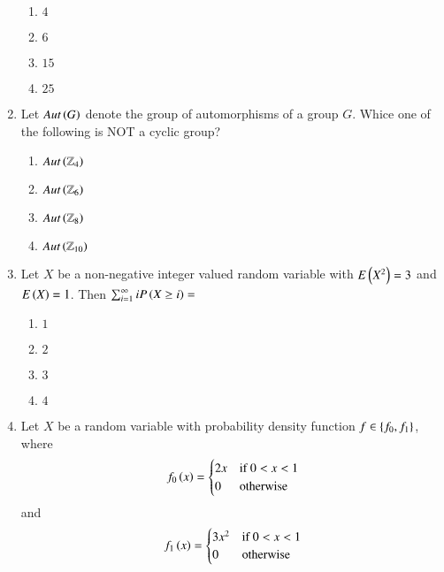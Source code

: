 \documentclass[journal,onecolumn]{IEEEtran}
\theoremstyle{remark}
\begin{document}
\begin{enumerate}
	\begin{enumerate}
		\item $4$ 
		\item $6$
		\item $15$
		\item $25$
	\end{enumerate}


    \item Let $Aut\left(G\right)$ denote the group of automorphisms of a group $G$. Whice one of the following is NOT a cyclic group?

	\begin{enumerate}
		\item $Aut\left(\mathbb{Z}_4\right)$
		\item $Aut\left(\mathbb{Z}_6\right)$
		\item $Aut\left(\mathbb{Z}_8\right)$
		\item $Aut\left(\mathbb{Z}_{10}\right)$
	\end{enumerate}

    \item Let $X$ be a non-negative integer valued random variable with $E\left(X^2\right) = 3$ and $E\left(X\right) = 1$. Then $\sum_{i = 1}^{\infty} iP\left(X \geq i\right) = $

	\begin{enumerate}
		\item $1$
		\item $2$
		\item $3$
		\item $4$
	\end{enumerate}

    \item Let $X$ be a random variable with probability density function $f \in \left\{f_0, f_1\right\}$, where
	\begin{align*}
		f_0\left(x\right) = 
		\begin{cases}
			2x & \text{if } 0 < x < 1\\
			0 & \text{otherwise}\\
		\end{cases}
	\end{align*}
	and
	\begin{align*}
		f_1\left(x\right) = 
		\begin{cases}
			3x^2 & \text{if } 0 < x < 1\\
			0 & \text{otherwise}\\
		\end{cases}
	\end{align*}


\end{enumerate}
\end{document}
